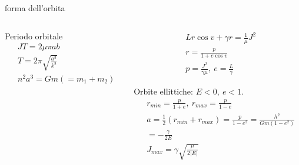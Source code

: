 \begin{frame}{forma dell'orbita}
\begin{columns}
\begin{column}{0.4\textwidth}

\begin{block}{Periodo orbitale}
\begin{align*}
&JT=2\mu\pi ab\\
&T=2\pi\sqrt{\frac{a^3}{k^2}}\\
&n^2a^3=Gm(=m_1+m_2)
\end{align*}
\end{block}
\end{column}
\begin{column}{0.6\textwidth}
\begin{align*}
&Lr\cos{v}+\gamma r=\frac{1}{\mu}J^2\\
&r=\frac{p}{1+e\cos{v}}\\
&p=\frac{J^2}{\gamma\mu},\ e=\frac{L}{\gamma}
\end{align*}
\begin{block}{Orbite ellittiche: $E<0,\ e<1$.}
\begin{align*}
&r_{min}=\frac{p}{1+e},\ r_{max}=\frac{p}{1-e}\\
&a=\frac{1}{2}(r_{min}+r_{max})=\frac{p}{1-e^2}=\frac{h^2}{Gm(1-e^2)}\\
&=-\frac{\gamma}{2E}\\
&J_{max}=\gamma\sqrt{\frac{\mu}{2|E|}}
\end{align*}
\end{block}
\end{column}
\end{columns}
\end{frame}

